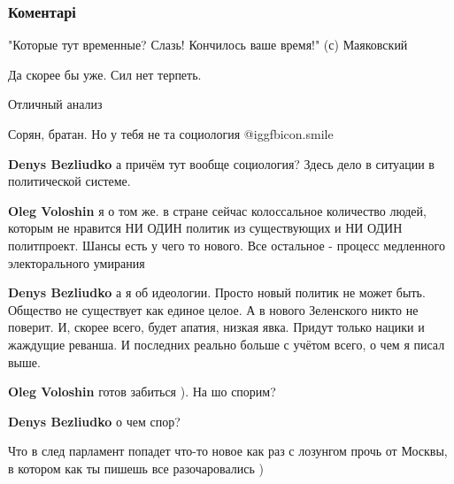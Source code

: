  
 
 
 
 
\subsubsection{Коментарі}
\label{sec:03_11_2021.fb.voloshin_oleg.opzzh.1.obschestvo_krizis.cmt}

\begin{itemize} %
"Которые тут временные? Слазь! Кончилось ваше время!" (с) Маяковский

Да скорее бы уже. Сил нет терпеть.

Отличный анализ

Сорян, братан. Но у тебя не та социология  @igg{fbicon.smile} 

\begin{itemize} %
\textbf{Denys Bezliudko} а причём тут вообще социология? Здесь дело в ситуации в политической системе.

\textbf{Oleg Voloshin} я о том же. в стране сейчас колоссальное количество людей, которым не нравится НИ ОДИН политик из существующих и НИ ОДИН политпроект. Шансы есть у чего то нового. Все остальное - процесс медленного электорального умирания

\textbf{Denys Bezliudko} а я об идеологии. Просто новый политик не может быть. Общество не существует как единое целое. А в нового Зеленского никто не поверит. И, скорее всего, будет апатия, низкая явка. Придут только нацики и жаждущие реванша. И последних реально больше с учётом всего, о чем я писал выше.

\textbf{Oleg Voloshin} готов забиться ). На шо спорим?

\textbf{Denys Bezliudko} о чем спор?

Что в след парламент попадет что-то новое как раз с лозунгом прочь от Москвы, в котором как ты пишешь все разочаровались )
\end{itemize} %


\end{itemize}

